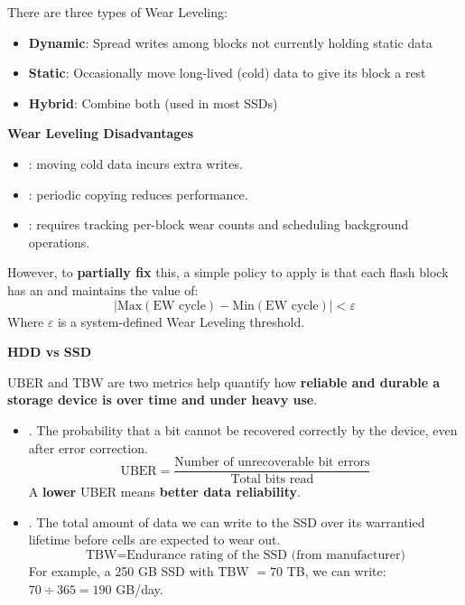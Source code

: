 \noindent
There are three types of Wear Leveling:
\begin{itemize}
    \item \textbf{Dynamic}: Spread writes among blocks not currently holding static data
    \item \textbf{Static}: Occasionally move long-lived (cold) data to give its block a rest
    \item \textbf{Hybrid}: Combine both (used in most SSDs)
\end{itemize}
\textcolor{Red2}{ \textbf{Wear Leveling Disadvantages}}
\begin{itemize}
    \item {}: moving cold data incurs extra writes.
    \item {}: periodic copying reduces performance.
    \item {}: requires tracking per-block wear counts and scheduling background operations.
\end{itemize}
However, to \textbf{partially fix} this, a simple policy to apply is that each flash block has an  and maintains the value of:
\begin{equation}
    \left| \mathrm{Max}\left(\text{EW cycle}\right) - \mathrm{Min}\left(\text{EW cycle}\right) \right| < \varepsilon
\end{equation}
Where $\varepsilon$ is a system-defined Wear Leveling threshold.

\highspace
\begin{flushleft}
    \textcolor{Red2}{ \textbf{HDD vs SSD}}
\end{flushleft}
UBER and TBW are two metrics help quantify how \textbf{reliable and durable a storage device is over time and under heavy use}.
\begin{itemize}
    \item {}. The probability that a bit cannot be recovered correctly by the device, even after error correction.
    \begin{equation}
        \text{UBER} = \dfrac{\text{Number of unrecoverable bit errors}}{\text{Total bits read}}
    \end{equation}
    A \textbf{lower} UBER means \textbf{better data reliability}.
    
    \item {}. The total amount of data we can write to the SSD over its warrantied lifetime before cells are expected to wear out.
    \begin{equation}
        \text{TBW} = \text{Endurance rating of the SSD (from manufacturer)}
    \end{equation}
    For example, a 250 GB SSD with TBW $= 70$ TB, we can write: $70 \div 365 = 190$ GB/day.
\end{itemize}

